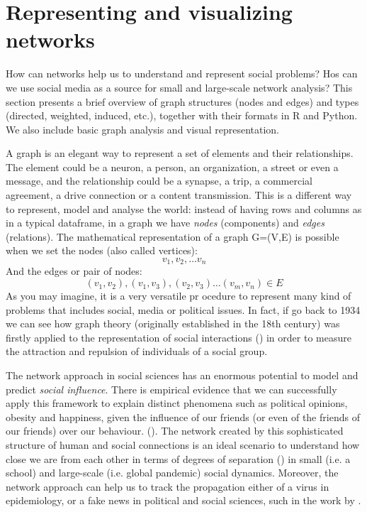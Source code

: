 \section{Representing and visualizing networks}
\label{sec:graph}

How can networks help us to understand and represent social problems? Hos can we use social media as a source for small and large-scale network analysis? This section presents a brief overview of graph structures (nodes and edges) and types (directed, weighted, induced, etc.), together with their formats in R and Python. We also include basic graph analysis and visual representation. 
 
A graph is an elegant way to represent a set of elements and their relationships. The element could be a neuron, a person, an organization, a street or even a message, and the relationship could be a synapse, a trip, a commercial agreement, a drive connection or a content transmission. This is a different way to represent, model and analyse the world: instead of having rows and columns as in a typical dataframe, in a graph we have \textit{nodes} (components) and \textit{edges} (relations). The mathematical representation of a graph G=(V,E) is possible when we set the nodes (also called vertices): \[{v_{1}, v_{2},… v_{n}}\] And the edges or pair of nodes: \[{(v_{1}, v_{2}), (v_{1}, v_{3}), (v_{2},v_{3}) … (v_{m}, v_{n}) \in E}\] As you may imagine, it is a very versatile pr	ocedure to represent many kind of problems that includes social, media or political issues. In fact, if go back to 1934 we can see how graph theory (originally established in the 18th century) was firstly applied to the representation of social interactions (\cite{moreno1934shall}) in order to measure the attraction and repulsion of individuals of a social group.

The network approach in social sciences has an enormous potential to model and predict \textit{social influence}. There is empirical evidence that we can successfully apply this framework to explain distinct phenomena such as political opinions, obesity and happiness, given the influence of our friends (or even of the friends of our friends) over our behaviour. (\cite{christakis2009connected}). The network created by this sophisticated structure of human and social connections is an ideal scenario to understand how close we are from each other in terms of degrees of separation (\cite{watts2004six}) in small (i.e. a school) and large-scale (i.e. global pandemic) social dynamics. Moreover, the network approach can help us to track the propagation either of a virus in epidemiology, or a fake news in political and social sciences, such in the work by 
\citet{vosoughi2018spread}. 

